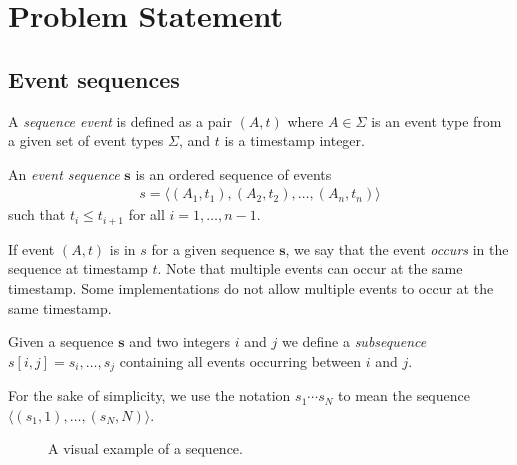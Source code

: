 \section{Problem Statement}

\subsection{Event sequences}

\begin{definition}
A \emph{sequence event} is defined as a pair $ (A, t) $ where $ A \in \Sigma $ is an event type from a given set of event types $ \Sigma $, and $ t $ is a timestamp integer.
\end{definition}

\begin{definition}
An \emph{event sequence} $ \boldsymbol{s} $ is an ordered sequence of events
\begin{align*}
s = \langle (A_1, t_1), (A_2, t_2), \ldots, (A_n, t_n) \rangle
\end{align*}
such that $ t_i \leq t_{i + 1} $ for all $ i = 1, \ldots, n - 1 $.
\end{definition}

If event $ (A, t) $ is in $ s $ for a given sequence $ \boldsymbol{s} $, we say that the event \emph{occurs} in the sequence at timestamp $ t $. Note that multiple events can occur at the same timestamp. Some implementations do not allow multiple events to occur at the same timestamp.

Given a sequence $ \boldsymbol{s} $ and two integers $ i $ and $ j $ we define a \emph{subsequence} $ s[i, j] = s_i, \ldots, s_j $ containing all events occurring between $ i $ and $ j $.

For the sake of simplicity, we use the notation $ s_1 \cdots s_N $ to mean the sequence $ \langle (s_1, 1), \ldots,\allowbreak(s_N, N) \rangle $.

\begin{figure}
\centering


\caption{A visual example of a sequence.}

\label{fig:event-sequence}
\end{figure}

